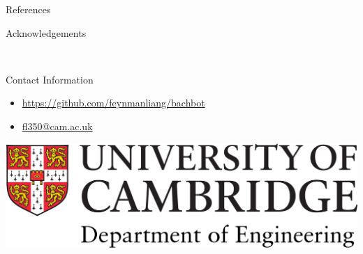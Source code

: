 \documentclass[final]{beamer}
\newlength{\onecolwid}
\begin{document}
\begin{frame}[t]
\begin{columns}[t]
\begin{column}{\onecolwid}

\begin{block}{References}

\nocite{*} %
\small{
\vspace{0.75in}}

\end{block}



\begin{block}{Acknowledgements}

\small{} \\

\end{block}



\begin{alertblock}{Contact Information}

\begin{itemize}
\item \href{https://github.com/feynmanliang/bachbot}{https://github.com/feynmanliang/bachbot}
\item \href{mailto:fl350@cam.ac.uk}{fl350@cam.ac.uk}
\end{itemize}

\end{alertblock}

\begin{center}
  \includegraphics[width=0.5\linewidth]{Engineering.png}
\end{center}


\end{column}
\end{columns}
\end{frame}
\end{document}
